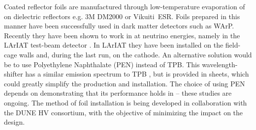 Coated reflector foils are manufactured through low-temperature evaporation of  on dielectric reflectors e.g. 3M DM2000 or Vikuiti\texttrademark\  ESR. Foils prepared in this manner have been successfully used in dark matter detectors such as WArP\cite{Acciarri:2008kv}. Recently they have been shown to work in  at neutrino energies, namely  in the LArIAT test-beam detector \cite{Garcia-Gamez:2017cmu}. In LArIAT they have been installed on the field-cage walls and, during the last run, on the cathode. An alternative solution would be to use Polyethylene Naphthalate (PEN) instead of TPB. This wavelength-shifter has a similar emission spectrum to TPB \cite{Kuzniak:2018dcf}, but is provided in sheets, which could greatly simplify the production and installation. The choice of using PEN depends on demonstrating that its performance holds in \lar -- these studies are ongoing. 
The method of foil installation is being developed in collaboration with the DUNE HV consortium, with the objective of minimizing the impact on the  design. 



